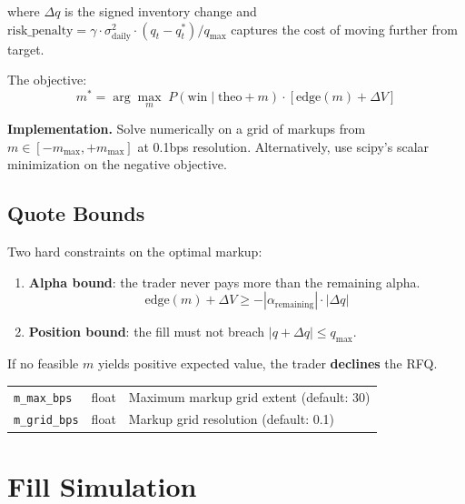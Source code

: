 \documentclass[11pt,a4paper]{article}
\begin{document}
where $\Delta q$ is the signed inventory change and $\text{risk\_penalty} = \gamma \cdot \sigma^2_{\text{daily}} \cdot (q_t - q^*_t) / q_{\max}$ captures the cost of moving further from target.

The objective:
\begin{equation}
m^* = \arg\max_m \; P\!\left(\text{win} \;\big|\; \text{theo} + m\right) \cdot \left[\text{edge}(m) + \Delta V\right]
\end{equation}

\textbf{Implementation.} Solve numerically on a grid of markups from $m \in [-m_{\max}, +m_{\max}]$ at 0.1bps resolution. Alternatively, use scipy's scalar minimization on the negative objective.

\subsection{Quote Bounds}

Two hard constraints on the optimal markup:
\begin{enumerate}[leftmargin=2em]
  \item \textbf{Alpha bound}: the trader never pays more than the remaining alpha.
  \begin{equation}
  \text{edge}(m) + \Delta V \geq -|\alpha_{\text{remaining}}| \cdot |\Delta q|
  \end{equation}
  \item \textbf{Position bound}: the fill must not breach $|q + \Delta q| \leq q_{\max}$.
\end{enumerate}

If no feasible $m$ yields positive expected value, the trader \textbf{declines} the RFQ.

\begin{parambox}[Knobs]
\begin{tabular}{@{}lll@{}}
\texttt{m\_max\_bps} & float & Maximum markup grid extent (default: 30) \\
\texttt{m\_grid\_bps} & float & Markup grid resolution (default: 0.1) \\
\end{tabular}
\end{parambox}


\section{Fill Simulation}\label{sec:fill}
\end{document}
